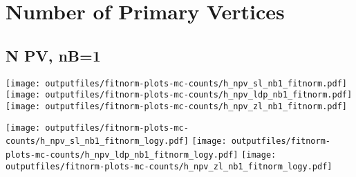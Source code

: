 \documentclass[11pt]{article}
\begin{document}
    \section{Number of Primary Vertices }

    \subsection{ N PV, nB=1 }

    \noindent
     \texttt{[image: outputfiles/fitnorm-plots-mc-counts/h\_npv\_sl\_nb1\_fitnorm.pdf]}
     \texttt{[image: outputfiles/fitnorm-plots-mc-counts/h\_npv\_ldp\_nb1\_fitnorm.pdf]}
     \texttt{[image: outputfiles/fitnorm-plots-mc-counts/h\_npv\_zl\_nb1\_fitnorm.pdf]}

    \noindent
     \texttt{[image: outputfiles/fitnorm-plots-mc-counts/h\_npv\_sl\_nb1\_fitnorm\_logy.pdf]}
     \texttt{[image: outputfiles/fitnorm-plots-mc-counts/h\_npv\_ldp\_nb1\_fitnorm\_logy.pdf]}
     \texttt{[image: outputfiles/fitnorm-plots-mc-counts/h\_npv\_zl\_nb1\_fitnorm\_logy.pdf]}





  
\end{document}
